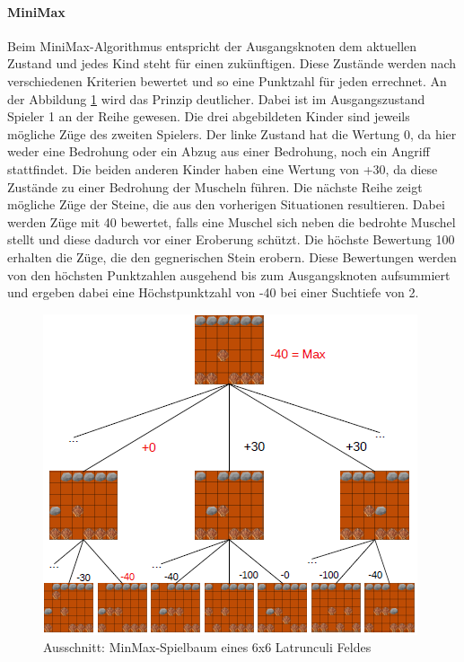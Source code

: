 \paragraph{MiniMax}
Beim MiniMax-Algorithmus entspricht der Ausgangsknoten dem aktuellen Zustand und jedes Kind steht für einen zukünftigen. Diese Zustände werden nach verschiedenen Kriterien bewertet und so eine Punktzahl für jeden errechnet. An der Abbildung \ref{fig:Spielbaum} wird das Prinzip deutlicher. Dabei ist im Ausgangszustand Spieler 1 an der Reihe gewesen. Die drei abgebildeten Kinder sind jeweils mögliche Züge des zweiten Spielers. Der linke Zustand hat die Wertung 0, da hier weder eine Bedrohung oder ein Abzug aus einer Bedrohung, noch ein Angriff stattfindet. Die beiden anderen Kinder haben eine Wertung von +30, da diese Zustände zu einer Bedrohung der Muscheln führen. Die nächste Reihe zeigt mögliche Züge der Steine, die aus den vorherigen Situationen resultieren. Dabei werden Züge mit 40 bewertet, falls eine Muschel sich neben die bedrohte Muschel stellt und diese dadurch vor einer Eroberung schützt. Die höchste Bewertung 100 erhalten die Züge, die den gegnerischen Stein erobern. Diese Bewertungen werden von den höchsten Punktzahlen ausgehend bis zum Ausgangsknoten aufsummiert und ergeben dabei eine Höchstpunktzahl von -40 bei einer Suchtiefe von 2. %

\begin{figure}[h]
	\centering
	\includegraphics{img/Spielbaum_latrun4}
	\caption{ Ausschnitt: MinMax-Spielbaum eines 6x6 Latrunculi Feldes}
	\label{fig:Spielbaum}
\end{figure}

